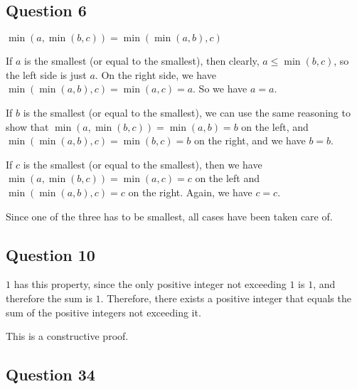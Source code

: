 \documentclass[12pt]{article}
\begin{document}
\pagebreak

\subsection*{Question 6}

$\min(a, \min(b, c)) = \min(\min(a, b), c)$

If $a$ is the smallest (or equal to the smallest), then clearly, 
$a \leq \min(b, c)$, so the left side is just $a$. On the right side, we
have $\min(\min(a, b), c) = \min(a, c) = a$. So we have $a=a$.

If $b$ is the smallest (or equal to the smallest), we can use the same
reasoning to show that $\min(a, \min(b, c)) = \min(a, b) = b$ on the left,
and $\min(\min(a, b), c) = \min(b, c) = b$ on the right, and we have $b=b$.

If $c$ is the smallest (or equal to the smallest), then we have
$\min(a, \min(b,c)) = \min(a, c) = c$ on the left and $\min(\min(a, b), c) = c$
on the right. Again, we have $c = c$.

Since one of the three has to be smallest, all cases have been taken care of.

\subsection*{Question 10}

$1$ has this property, since the only positive integer not exceeding $1$ is $1$,
and therefore the sum is $1$. Therefore, there exists a positive integer that
equals the sum of the positive integers not exceeding it.

This is a constructive proof.

\subsection*{Question 34}
\end{document}
